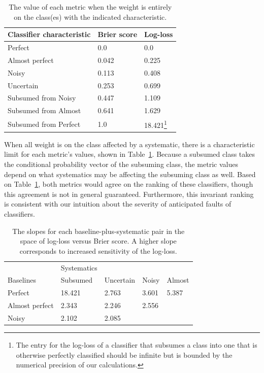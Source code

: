 \begin{table}[]
\begin{tabular}{lll}
Classifier characteristic & Brier score & Log-loss\\
\hline
Perfect & 0.0 & 0.0\\
Almost perfect & 0.042 & 0.225\\
Noisy & 0.113 & 0.408\\
Uncertain & 0.253 & 0.699\\
Subsumed from Noisy & 0.447 & 1.109\\
Subsumed from Almost & 0.641 & 1.629\\
Subsumed from Perfect & 1.0 & 18.421\footnote{The entry for the log-loss of a classifier that subsumes a class into one that is otherwise perfectly classified should be infinite but is bounded by the numerical precision of our calculations.}
\end{tabular}
\caption{The value of each metric when the weight is entirely on the class(es) with the indicated characteristic.}
\label{tab:extents}
\end{table}

When all weight is on the class affected by a systematic, there is a characteristic limit for each metric's values, shown in Table~\ref{tab:extents}.
Because a subsumed class takes the conditional probability vector of the subsuming class, the metric values depend on what systematics may be affecting the subsuming class as well.
Based on Table~\ref{tab:extents}, both metrics would agree on the ranking of these classifiers, though this agreement is not in general guaranteed.
Furthermore, this invariant ranking is consistent with our intuition about the severity of anticipated faults of classifiers.

\begin{table}[]
\begin{tabular}{l|llll}
	& Systematics & & &\\
Baselines & Subsumed & Uncertain & Noisy & Almost\\
\hline
Perfect & 18.421 & 2.763 & 3.601 & 5.387\\
Almost perfect & 2.343 & 2.246 & 2.556 & \\
Noisy & 2.102 & 2.085 & &
\end{tabular}
\caption{The slopes for each baseline-plus-systematic pair in the space of log-loss  versus Brier score.
A higher slope corresponds to increased sensitivity of the log-loss.}
\label{tab:slopes}
\end{table}

